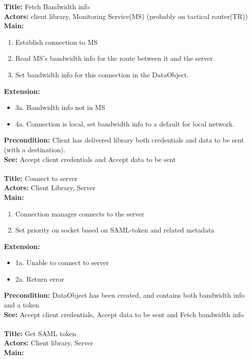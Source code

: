 		\textbf{Title:} Fetch Bandwidth info \\
		\textbf{Actors:} client library, Monitoring Service(MS) (probably on tactical router(TR)) \\
		\textbf{Main:}
		\begin{enumerate}
			\item Establish connection to MS
			\item Read MS’s bandwidth info for the route between it and the server.
			\item Set bandwidth info for this connection in the DataObject.
		\end{enumerate}
		\textbf{Extension:}
		\begin{itemize}
			  \item[] 3a. Bandwidth info not in MS
			  \item[] 4a. Connection is local, set bandwidth info to a default for local network.
		\end{itemize}
		\textbf{Precondition:} Client has delivered library both credentials and data to be sent (with a destination). \\
		\textbf{See:} Accept client credentials and Accept data to be sent 
		\\\\
		\textbf{Title:} Connect to server \\
		\textbf{Actors:} Client Library, Server \\
		\textbf{Main:}
		\begin{enumerate}	
			\item Connection manager connects to the server
			\item Set priority on socket based on SAML-token and related metadata
		\end{enumerate}
		\textbf{Extension:}
		\begin{itemize}
			  \item[] 1a. Unable to connect to server
			  \item[] 2a. Return error
		\end{itemize}
		\textbf{Precondition:} DataObject has been created, and contains both bandwidth info and a token \\
		\textbf{See:} Accept client credentials, Accept data to be sent and Fetch bandwidth info
		\\\\
		\textbf{Title:} Get SAML token \\
		\textbf{Actors:} Client library, Server \\
		\textbf{Main:}
